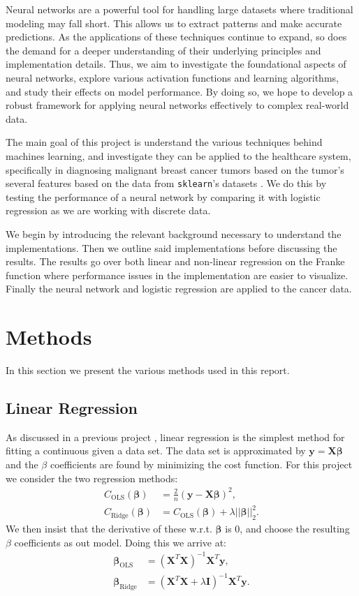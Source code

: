 \documentclass[%
reprint,s
amsmath,amssymb,
aps,
]{revtex4-2}
\begin{document}
Neural networks are a powerful tool for handling large datasets where traditional modeling may fall short. This allows us to extract patterns and make accurate predictions. As the applications of these techniques continue to expand, so does the demand for a deeper understanding of their underlying principles and implementation details. Thus, we aim to investigate the foundational aspects of neural networks, explore various activation functions and learning algorithms, and study their effects on model performance. By doing so, we hope to develop a robust framework for applying neural networks effectively to complex real-world data.

The main goal of this project is understand the various techniques behind machines learning, and investigate they can be applied to the healthcare system, specifically in diagnosing malignant breast cancer tumors based on the tumor's several features based on the data from \texttt{sklearn}'s datasets \cite{sklearn}. We do this by testing the performance of a neural network by comparing it with logistic regression as we are working with discrete data. 

We begin by introducing the relevant background necessary to understand the implementations. Then we outline said implementations before discussing the results. The results go over both linear and non-linear regression on the Franke function where performance issues in the implementation are easier to visualize. Finally the neural network and logistic regression are applied to the cancer data. 

\section{Methods}
In this section we present the various methods used in this report. 

\subsection{Linear Regression}
As discussed in a previous project \cite{project1}, linear regression is the simplest method for fitting a continuous given a data set. The data set is approximated by $\bm y=\bm X\bm\beta$ and the $\beta$ coefficients are found by minimizing the cost function. For this project we consider the two regression methods:
\begin{align}
	C_\text{OLS}(\bm\beta)&=\frac{2}{n}(\bm y-\bm X\bm\beta)^2,\\
	C_\text{Ridge}(\bm\beta)&=C_\text{OLS}(\bm\beta)+\lambda||\bm\beta||_2^2.
\end{align}
We then insist that the derivative of these w.r.t. $\bm\beta$ is $0$, and choose the resulting $\beta$ coefficients as out model. Doing this we arrive at:
\begin{align}
	\bm\beta_\text{OLS}&=(\bm X^T\bm X)^{-1}\bm X^T\bm y,\\
	\bm\beta_\text{Ridge}&=(\bm X^T\bm X+\lambda \bm I)^{-1}\bm X^T\bm y.
\end{align}
\end{document}
